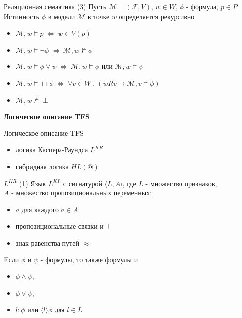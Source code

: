 \documentclass{beamer}
\begin{document}
\begin{frame}{Реляционная семантика (3)}
Пусть $\mathcal{M} = (\mathcal{F}, V)$, $w \in W$, $\phi$ - формула, $p \in P$\\
\bigskip
Истинность $\phi$ в модели $\mathcal{M}$ в точке $w$ определяется рекурсивно\\
\bigskip
\begin{itemize}
  \item $\mathcal{M}, w \models p \; \Longleftrightarrow \; w \in V(p)$
  \item $\mathcal{M}, w \models \neg \phi \; \Longleftrightarrow \; \mathcal{M}, w \not\models \phi$
  \item $\mathcal{M}, w \models \phi \vee \psi \; \Longleftrightarrow \; \mathcal{M}, w \models \phi$ или $\mathcal{M}, w \models \psi$
  \item $\mathcal{M}, w \models \Box \phi \; \Longleftrightarrow \; \forall v \in W \; . \; (w R v \to \mathcal{M}, v \models \phi)$
  \item $\mathcal{M}, w \not\models \perp$
\end{itemize}
\end{frame}



\begin{frame}{}
\begin{center}
	\textbf{Логическое описание TFS}
\end{center}
\end{frame}

\begin{frame}{Логическое описание TFS}
\begin{itemize}
	\item логика Каспера-Раундса $L^{KR}$
	\item гибридная логика $HL(@)$
\end{itemize}
\end{frame}

\begin{frame}{$L^{KR}$ (1)}
Язык $L^{KR}$ с сигнатурой $\langle L, A \rangle$, где $L$ - множество признаков, \\$A$ - множество пропозициональных переменных:\\
\bigskip
\begin{itemize}
	\item $a$ для каждого $a \in A$
	\item пропозициональные связки и $\top$
	\item знак равенства путей $\approx$
\end{itemize}
\bigskip	
Eсли $\phi$ и $\psi$ - формулы, то также формулы и 
\begin{itemize}
	\item $\phi \wedge \psi$,
	\item $\phi \vee \psi$,
	\item $l : \phi$ или $\langle l \rangle \phi$ для $l \in L$
\end{itemize}
\end{frame}
\end{document}
